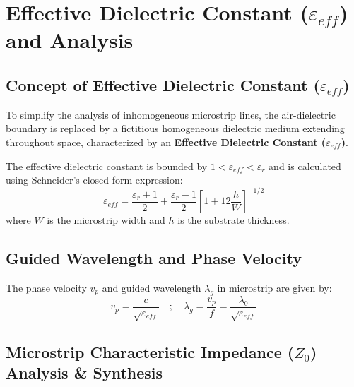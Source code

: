\documentclass[10pt,a4paper]{article}
\begin{document}
\section{Effective Dielectric Constant (\texorpdfstring{$\varepsilon_{eff}$}{epsilon\_eff}) and Analysis}

\subsection{Concept of Effective Dielectric Constant (\texorpdfstring{$\varepsilon_{eff}$}{epsilon\_eff})}
To simplify the analysis of inhomogeneous microstrip lines, the air-dielectric boundary is replaced by a fictitious homogeneous dielectric medium extending throughout space, characterized by an \textbf{Effective Dielectric Constant ($\varepsilon_{eff}$)}.

\begin{tcolorbox}[formulabox, title={Effective Dielectric Constant ($\varepsilon_{eff}$) Formula}]
  The effective dielectric constant is bounded by $1 < \varepsilon_{eff} < \varepsilon_r$ and is calculated using Schneider's closed-form expression:
  \begin{equation}
    \varepsilon_{eff} = \frac{\varepsilon_r + 1}{2} + \frac{\varepsilon_r - 1}{2} \left[ 1 + 12\frac{h}{W} \right]^{-1/2}
  \end{equation}
  where $W$ is the microstrip width and $h$ is the substrate thickness.
\end{tcolorbox}

\subsection{Guided Wavelength and Phase Velocity}
The phase velocity $v_p$ and guided wavelength $\lambda_g$ in microstrip are given by:
\begin{equation}
  v_p = \frac{c}{\sqrt{\varepsilon_{eff}}} \quad ; \quad \lambda_g = \frac{v_p}{f} = \frac{\lambda_0}{\sqrt{\varepsilon_{eff}}}
\end{equation}

\subsection{Microstrip Characteristic Impedance (\texorpdfstring{$Z_0$}{Z0}) Analysis \& Synthesis}
\end{document}
